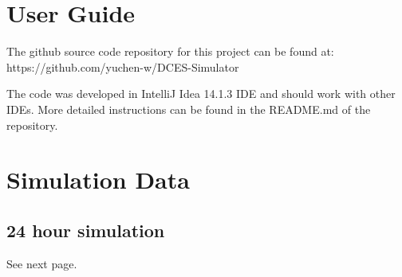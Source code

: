 \begin{appendices}
\label{Appendix}
\chapter{User Guide}
\label{Guide}

The github source code repository for this project can be found at: https://github.com/yuchen-w/DCES-Simulator

The code was developed in IntelliJ Idea 14.1.3 IDE and should work with other IDEs. More detailed instructions can be found in the README.md of the repository.

\chapter{Simulation Data}
\section{24 hour simulation}
See next page.

\end{appendices}